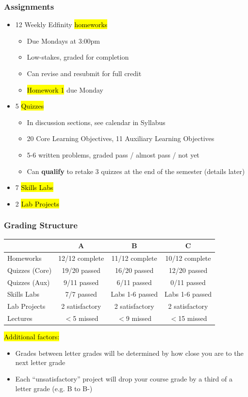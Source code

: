 \documentclass[slidestop,compress,mathserif]{beamer}
\begin{document}
\begin{frame}
	\frametitle{Assignments}
	\begin{itemize}
		\item 12 Weekly Edfinity \hl{homeworks}
		\begin{itemize}
			\item Due Mondays at 3:00pm
			\item Low-stakes, graded for completion
			\item Can revise and resubmit for full credit
			\item \hl{Homework 1} due Monday
		\end{itemize} 
		\item 5 \hl{Quizzes} 
		\begin{itemize}
			\item In discussion sections, see calendar in Syllabus
			\item 20 Core Learning Objectives, 11 Auxiliary Learning Objectives
			\item 5-6 written problems, graded pass / almost pass / not yet
			\item Can \textbf{qualify} to retake 3 quizzes at the end of the semester (details later)
		\end{itemize}
		\item 7 \hl{Skills Labs}
		\item 2 \hl{Lab Projects}
	\end{itemize}
\end{frame}

\begin{frame}
	\frametitle{Grading Structure}
	\begin{table}[ht]
	\centering
	\small
	\begin{tabular}{|l|c|c|c|}
	\hline
	 & \textbf{A} & \textbf{B} & \textbf{C} \\
	\hline
	Homeworks & 12/12 complete & 11/12 complete & 10/12 complete \\
	\hline
	Quizzes (Core) & 19/20 passed & 16/20 passed & 12/20 passed \\
	\hline
	Quizzes (Aux) & 9/11 passed & 6/11 passed & 0/11 passed \\
	\hline
	Skills Labs & 7/7 passed & Labs 1-6 passed & Labs 1-6 passed \\
	\hline
	Lab Projects & 2 satisfactory & 2 satisfactory & 2 satisfactory \\
	\hline
	Lectures & $<$5 missed & $<$9 missed & $<$15 missed \\
	\hline
	\end{tabular}
	\end{table}

	\hl{Additional factors:}
	\begin{itemize}
		\item Grades between letter grades will be determined by how close you are to the next letter grade
		\item Each ``unsatisfactory'' project will drop your course grade by a third of a letter grade (e.g. B to B-)
	\end{itemize}
\end{frame}
\end{document}
